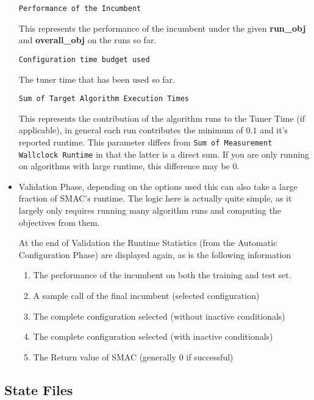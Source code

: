 \documentclass[manual.tex]{subfiles}
\begin{document}
\begin{itemize}
\texttt{Performance of the Incumbent}

This represents the performance of the incumbent under the given \textbf{run\_obj} and \textbf{overall\_obj} on the runs so far.

\texttt{Configuration time budget used}

The tuner time that has been used so far.

\texttt{Sum of Target Algorithm Execution Times} 

This represents the contribution of the algorithm runs to the Tuner Time (if applicable), in general each run contributes the minimum of $0.1$ and it's reported runtime. This parameter differs from \texttt{Sum of Measurement Wallclock Runtime} in that the latter is a direct sum. If you are only running on algorithms with large runtime, this difference may be 0.

\item Validation Phase, depending on the options used this can also take a large fraction of SMAC's runtime. The logic here is actually quite simple, as it largely only requires running many algorithm runs and computing the objectives from them.

At the end of Validation the Runtime Statistics (from the Automatic Configuration Phase) are displayed again, as is the following information

\begin{enumerate}

\item The performance of the incumbent on both the training and test set.
\item A sample call of the final incumbent (selected configuration)
\item The complete configuration selected (without inactive conditionals)
\item The complete configuration selected (with inactive conditionals)
\item The Return value of SMAC (generally 0 if successful)

\end{enumerate}

\end{itemize}

\subsection{State Files}\label{subsec:state-files}
\end{document}
